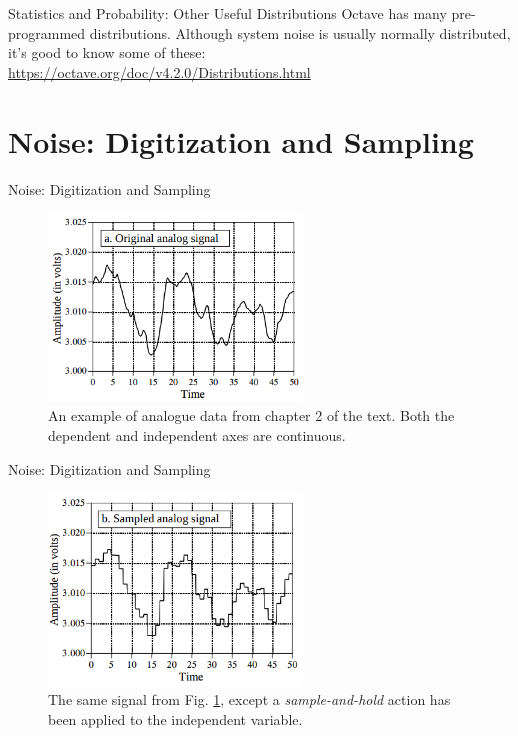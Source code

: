 \documentclass{beamer}
\begin{document}
\begin{frame}[fragile]{Statistics and Probability: Other Useful Distributions}
\small
Octave has many pre-programmed distributions.  Although system noise is usually normally distributed, it's good to know some of these: \\ \vspace{0.5cm}
\url{https://octave.org/doc/v4.2.0/Distributions.html}
\end{frame}

\section{Noise: Digitization and Sampling}

\begin{frame}[fragile]{Noise: Digitization and Sampling}
\begin{figure}
\centering
\includegraphics[width=0.6\textwidth]{figures/adc_dac1.png}
\caption{\label{fig:adc1} An example of analogue data from chapter 2 of the text.  Both the dependent and independent axes are continuous.}
\end{figure}
\end{frame}

\begin{frame}[fragile]{Noise: Digitization and Sampling}
\begin{figure}
\centering
\includegraphics[width=0.6\textwidth]{figures/adc_dac2.png}
\caption{\label{fig:adc2} The same signal from Fig. \ref{fig:adc1}, except a \textit{sample-and-hold} action has been applied to the independent variable.}
\end{figure}
\end{frame}
\end{document}
